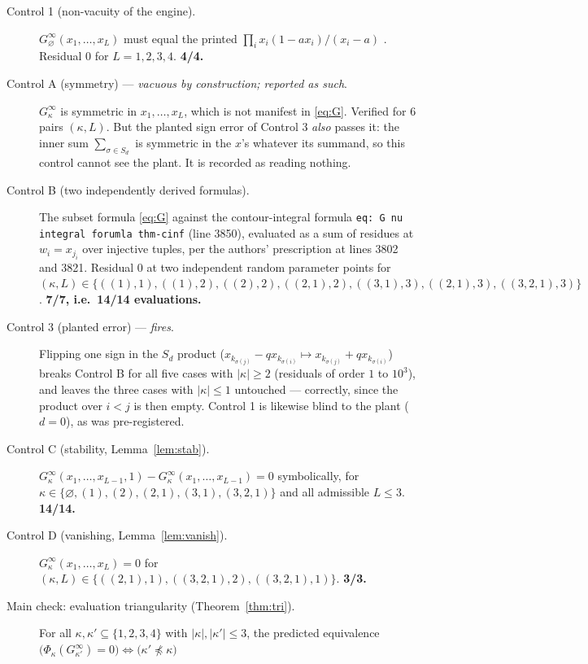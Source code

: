 \documentclass[11pt]{article}
\theoremstyle{definition}
\theoremstyle{remark}
\newcommand{\Gi}[1]{G^{\infty}_{#1}}
\begin{document}
\begin{description}
\item[Control 1 (non-vacuity of the engine).] $\Gi{\varnothing}(x_1,\dots,x_L)$ must equal the
  printed $\prod_i x_i(1-ax_i)/(x_i-a)$ \cite[line 620]{GDMW}. Residual $0$ for
  $L=1,2,3,4$. \textbf{4/4.}
\item[Control A (symmetry) --- \emph{vacuous by construction; reported as such}.] $\Gi\kappa$
  is symmetric in $x_1,\dots,x_L$, which is not manifest in \eqref{eq:G}. Verified for
  $6$ pairs $(\kappa,L)$. But the planted sign error of Control 3 \emph{also} passes it: the
  inner sum $\sum_{\sigma\in S_d}$ is symmetric in the $x$'s whatever its summand, so this
  control cannot see the plant. It is recorded as reading nothing.
\item[Control B (two independently derived formulas).] The subset formula \eqref{eq:G} against
  the contour-integral formula \texttt{eq: G nu integral forumla thm-cinf} (line 3850),
  evaluated as a sum of residues at $w_i=x_{j_i}$ over injective tuples, per the authors'
  prescription at lines 3802 and 3821. Residual $0$ at two independent random parameter points
  for $(\kappa,L)\in\{((1),1),((1),2),((2),2),((2,1),2),((3,1),3),((2,1),3),((3,2,1),3)\}$.
  \textbf{7/7, i.e.\ 14/14 evaluations.}
\item[Control 3 (planted error) --- \emph{fires}.] Flipping one sign in the $S_d$ product
  ($x_{k_{\sigma(j)}}-qx_{k_{\sigma(i)}}\mapsto x_{k_{\sigma(j)}}+qx_{k_{\sigma(i)}}$) breaks
  Control B for all five cases with $|\kappa|\ge2$ (residuals of order $1$ to $10^{3}$), and
  leaves the three cases with $|\kappa|\le1$ untouched --- correctly, since the product over
  $i<j$ is then empty. Control 1 is likewise blind to the plant ($d=0$), as was pre-registered.
\item[Control C (stability, Lemma~\ref{lem:stab}).] $\Gi\kappa(x_1,\dots,x_{L-1},1)
  -\Gi\kappa(x_1,\dots,x_{L-1})=0$ symbolically, for
  $\kappa\in\{\varnothing,(1),(2),(2,1),(3,1),(3,2,1)\}$ and all admissible $L\le3$.
  \textbf{14/14.}
\item[Control D (vanishing, Lemma~\ref{lem:vanish}).] $\Gi\kappa(x_1,\dots,x_L)=0$ for
  $(\kappa,L)\in\{((2,1),1),((3,2,1),2),((3,2,1),1)\}$. \textbf{3/3.}
\item[Main check: evaluation triangularity (Theorem~\ref{thm:tri}).] For all
  $\kappa,\kappa'\subseteq\{1,2,3,4\}$ with $|\kappa|,|\kappa'|\le3$, the predicted equivalence
  $\bigl(\Phi_\kappa(\Gi{\kappa'})=0\bigr)\Leftrightarrow\bigl(\kappa'\not\preceq\kappa\bigr)$

\end{description}
\end{document}
